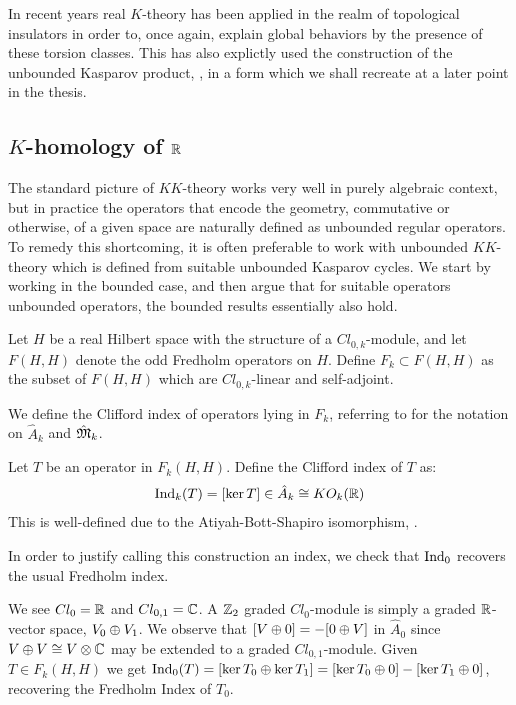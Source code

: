 In recent years real $K$-theory has been applied in the realm of topological insulators in order to, once again, explain global behaviors by the presence of these torsion classes. This has also explictly used the construction of the unbounded Kasparov product, \cite{bourne},  in a form which we shall recreate at a later point in the thesis. 
\subsection{$K$-homology of $\mathbb{R}$}
The standard picture of $KK$-theory works very well in purely algebraic context, but in practice the operators that encode the geometry, commutative or otherwise, of a given space are naturally defined as unbounded regular operators. To remedy this shortcoming, it is often preferable to work with unbounded $KK$-theory which is defined from suitable unbounded Kasparov cycles. 
We start by working in the bounded case, and then argue that for suitable operators unbounded operators, the bounded results essentially also hold.  
\begin{definition}
	Let $H$ be a real Hilbert space with the structure of a $Cl_{0,k}$-module, and let $F(H,H)$ denote the odd Fredholm operators on $H$. Define $F_k\subset F(H,H)$ as the subset of $F(H,H)$ which are $Cl_{0,k}$-linear and self-adjoint. 
\end{definition}
We define the Clifford index of operators lying in $F_k$, referring to  for the notation on $\hat{A}_k$ and $\hat{\mathfrak{M}}_k$. 
\begin{definition}
	Let $T$ be an operator in $F_k(H,H)$. Define the Clifford index of $T$ as:
	\begin{align*}
		\operatorname{Ind}_k(T)=[\ker T]\in \hat{A}_k\cong KO_{k}(\mathbb{R})
	\end{align*}
	This is well-defined due to the Atiyah-Bott-Shapiro isomorphism, .
\end{definition}
In order to justify calling this construction an index, we check that $\operatorname{Ind}_0$ recovers the usual Fredholm index. 
\begin{example}\label{cliffordkernel}
	We see $Cl_0=\mathbb{R}$ and $Cl_{0,1}=\mathbb{C}$. A $\mathbb{Z}_2$ graded $Cl_0$-module is simply a graded $\mathbb{R}$-vector space, $V_0\oplus V_1$. We observe that $[V\oplus 0]=-[0\oplus V]$ in $\hat{A}_0$ since $V\oplus V\cong V\otimes \mathbb{C}$ may be extended to a graded $Cl_{0,1}$-module. Given $T\in F_k(H,H)$ we get $\operatorname{Ind}_0(T)=[\ker T_0\oplus \ker T_1]=[\ker T_0 \oplus 0]-[\ker T_1 \oplus 0]$, recovering the Fredholm Index of $T_0$. 
\end{example}
